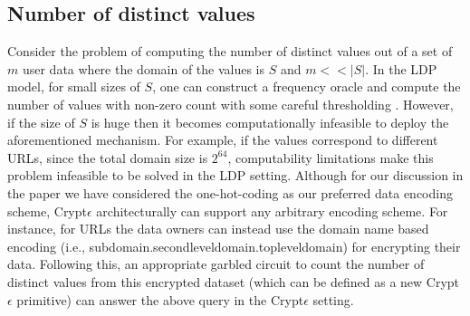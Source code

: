 \subsection*{Number of distinct values}
Consider the problem of computing the number of distinct values out of a set of $m$ user data where the domain of the values is $S$ and $m<<|S|$. In the \textsf{LDP} model, for small sizes of $S$, one can construct a frequency oracle and compute the number of values with non-zero count with some careful thresholding \cite{LDP1}. However, if the size of $S$ is huge then it becomes computationally infeasible to deploy the aforementioned mechanism. For example, if the values correspond to different URLs, since the total domain size is $2^{64}$, computability limitations make this problem infeasible to be solved in the \textsf{LDP} setting. Although for our discussion in the paper we have considered the one-hot-coding as our preferred data encoding scheme, Crypt$\epsilon$ architecturally can support any arbitrary encoding scheme.  For instance, for URLs the data owners can instead use the domain name based encoding (i.e., subdomain.secondleveldomain.topleveldomain) for encrypting their data. Following this, an appropriate garbled circuit to count the number of distinct values from this encrypted dataset (which can be defined as a new Crypt$\epsilon$ primitive) can answer the above query in the Crypt$\epsilon$ setting.

\begin{comment}\subsection{Answering queries with disjunctions in predicate} Now let us consider a DNF query predicate $\phi=\phi_1 \vee \phi_2$ where $\phi_1=(A_1==v_1 \wedge \ldots \wedge A_n==v_n)$ and $\phi_2=(A'_1==v'_1 \wedge \ldots \wedge A'_n==v'_n)$ are two conjunctive clauses. For a given record assume, \begin{gather*}\mathbf{d}=\mathbf{c_1}\oplus \mathbf{c_2}-labMult(\mathbf{c_1,c_2}) \\
\mathbf{c_1}=genLabMult(\mathbf{\tilde{R}}_{A1}[v_1], \ldots ,\mathbf{\tilde{R}}_{An}[v_n] ) \\ \mathbf{c_1}=genLabMult(\mathbf{\tilde{R}}_{A1}[v_1], \ldots ,\mathbf{\tilde{R}}_{An}[v_n] )\end{gather*} Note that $d=1$  only iff  the record satisfies $\phi$. Thus for a two clause  DNF predicate as above, the optimized Filter transformation takes as input $x \times y$ encrypted table $\tilde{\mathbf{T}}$ with attribute set $\bigcup_{i=1}^n Attribute(\phi_i)$ and outputs a $x \times 1$ encrypted table $\mathbf{\tilde{T}}'$ such that \begin{gather} \mathbf{\tilde{T}}'[i]= \mathbf{c_1}\oplus \mathbf{c_2}-labMult(\mathbf{c_1,c_2}) \\
\mathbf{c_1}=genLabMult(\mathbf{\tilde{R}}_{A1}[v_1], \ldots ,\mathbf{\tilde{R}}_{An}[v_n] ) \\ \mathbf{c_1}=genLabMult(\mathbf{\tilde{R}}_{A1}[v_1], \ldots ,\mathbf{\tilde{R}}_{An}[v_n] )\end{gather} For $t>2$ clauses in a DNF, apply the Filter transformation pairwise for $\lceil \log t \rceil$ iterations. 
\end{comment}
